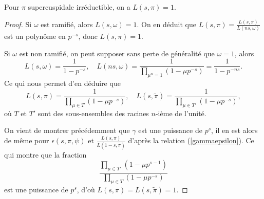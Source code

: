 \begin{proposition}
Pour $\pi$ supercuspidale irréductible, on a $L(s,\pi)=1$.
\end{proposition}

\begin{proof}
Si $\omega$ est ramifié, alors $L(s,\omega)=1$. On en déduit que
$L(s,\pi)=\frac{L(s,\pi)}{L(ns,\omega)}$ est un polynôme en $p^{-s}$, donc $L(s, \pi)=1$.

Si $\omega$ est non ramifié, on peut supposer sans perte de généralité que $\omega=1$, alors
\begin{equation}
L(s,\omega)=\frac{1}{1-p^{-s}}, \quad L(ns,\omega)=\frac{1}{\prod_{\mu^n=1}(1-\mu p^{-s})}=\frac{1}{1-p^{-ns}}.
\end{equation}
Ce qui nous permet d'en déduire que
\begin{equation}
L(s,\pi) = \frac{1}{\prod_{\mu \in T}(1-\mu p^{-s})}, \quad L(s,\tilde{\pi}) = \frac{1}{\prod_{\mu \in T'}(1-\mu p^{-s})},
\end{equation}
où $T$ et $T'$ sont des sous-ensembles des racines $n$-ième de l'unité.

On vient de montrer précédemment que $\gamma$ est une puissance de $p^s$, il en est alors de même pour $\epsilon(s,\pi,\psi)$ et $\frac{L(s,\pi)}{L(1-s,\tilde{\pi})}$ d'après la relation (\ref{gammaepsilon}). Ce qui montre que la fraction
\begin{equation}
\frac{\prod_{\mu \in T'}(1-\mu p^{s-1})}{\prod_{\mu \in T}(1-\mu p^{-s})}
\end{equation}
est une puissance de $p^s$, d'où $L(s,\pi)=L(s,\tilde{\pi})=1$.
\end{proof}